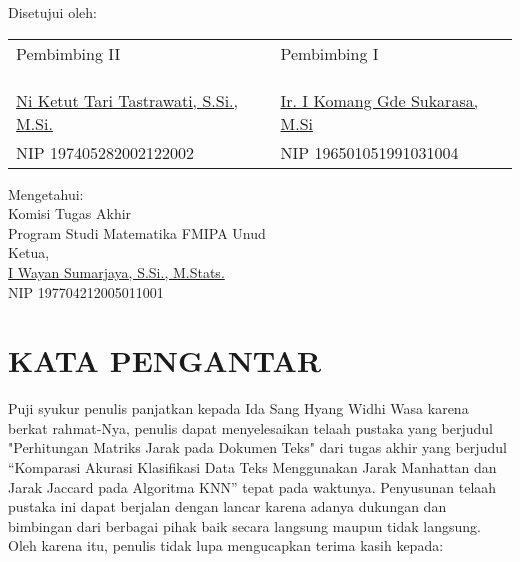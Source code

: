 \documentclass[a4paper,12pt]{report}
\numberwithin{equation}{chapter}
\begin{document}
\begin{center}
    Disetujui oleh:
\end{center}

\begin{center}
\begin{tabular}{>{\centering\arraybackslash}p{7cm} >{\centering\arraybackslash}p{7cm}}
    Pembimbing II & Pembimbing I \\
    \\
    \\
    \\
    \uline{Ni Ketut Tari Tastrawati, S.Si., M.Si.} & \uline{Ir. I Komang Gde Sukarasa, M.Si} \\
    NIP 197405282002122002 & NIP 196501051991031004 \\
\end{tabular}
\end{center}
\vspace{1cm}
\begin{center}
    Mengetahui:\\
    Komisi Tugas Akhir\\
    Program Studi Matematika FMIPA Unud\\
    Ketua,\\
    \vspace{2cm}
    \uline{I Wayan Sumarjaya, S.Si., M.Stats.}\\
    NIP 197704212005011001
\end{center}

\newpage
\renewcommand{\appendixname}{}
\chapter*{KATA PENGANTAR}


Puji syukur penulis panjatkan kepada Ida Sang Hyang Widhi Wasa karena berkat rahmat-Nya, penulis dapat menyelesaikan telaah pustaka yang berjudul "Perhitungan Matriks Jarak pada Dokumen Teks" dari tugas akhir yang berjudul “Komparasi Akurasi Klasifikasi Data Teks Menggunakan Jarak Manhattan dan Jarak Jaccard pada Algoritma KNN” tepat pada waktunya. Penyusunan telaah pustaka ini dapat berjalan dengan lancar karena adanya dukungan dan bimbingan dari berbagai pihak baik secara langsung maupun tidak langsung. Oleh karena itu, penulis tidak lupa mengucapkan terima kasih kepada:
\end{document}
